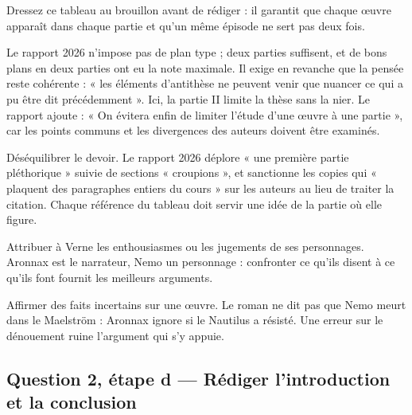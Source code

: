 \documentclass[11pt,a4paper]{article}
\begin{document}
\begin{methode}

Dressez ce tableau au brouillon avant de rédiger : il garantit que chaque œuvre apparaît dans chaque partie et qu'un même épisode ne sert pas deux fois.

\end{methode}

\begin{jury}

Le rapport 2026 n'impose pas de plan type ; deux parties suffisent, et de bons plans en deux parties ont eu la note maximale. Il exige en revanche que la pensée reste cohérente : « les éléments d'antithèse ne peuvent venir que nuancer ce qui a pu être dit précédemment ». Ici, la partie II limite la thèse sans la nier. Le rapport ajoute : « On évitera enfin de limiter l'étude d'une œuvre à une partie », car les points communs et les divergences des auteurs doivent être examinés.

\end{jury}

\begin{piege}

Déséquilibrer le devoir. Le rapport 2026 déplore « une première partie pléthorique » suivie de sections « croupions », et sanctionne les copies qui « plaquent des paragraphes entiers du cours » sur les auteurs au lieu de traiter la citation. Chaque référence du tableau doit servir une idée de la partie où elle figure.

\end{piege}

\begin{piege}

Attribuer à Verne les enthousiasmes ou les jugements de ses personnages. Aronnax est le narrateur, Nemo un personnage : confronter ce qu'ils disent à ce qu'ils font fournit les meilleurs arguments.

\end{piege}

\begin{piege}

Affirmer des faits incertains sur une œuvre. Le roman ne dit pas que Nemo meurt dans le Maelström : Aronnax ignore si le Nautilus a résisté. Une erreur sur le dénouement ruine l'argument qui s'y appuie.

\end{piege}

\hypertarget{question-2-uxe9tape-d-ruxe9diger-lintroduction-et-la-conclusion}{%
\subsection{Question 2, étape d --- Rédiger l'introduction et la conclusion}\label{question-2-uxe9tape-d-ruxe9diger-lintroduction-et-la-conclusion}}
\end{document}
